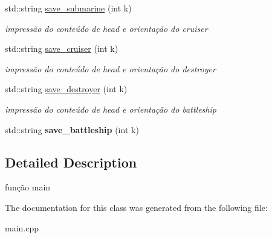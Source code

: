 \begin{DoxyCompactItemize}
\mbox{\label{classpuzzle_a4f95f4e9ad25a48f86b38559a92ad1cc}} 
std\+::string \hyperlink{classpuzzle_a4f95f4e9ad25a48f86b38559a92ad1cc}{save\+\_\+submarine} (int k)
\begin{DoxyCompactList}\small\item\em impressão do conteúdo de head e orientação do cruiser \end{DoxyCompactList}\item 
\mbox{\label{classpuzzle_afe8a003378bb26d97bf3bc872473838e}} 
std\+::string \hyperlink{classpuzzle_afe8a003378bb26d97bf3bc872473838e}{save\+\_\+cruiser} (int k)
\begin{DoxyCompactList}\small\item\em impressão do conteúdo de head e orientação do destroyer \end{DoxyCompactList}\item 
\mbox{\label{classpuzzle_a90b7a1dad1ea5d9ef4a61f0c12846ab7}} 
std\+::string \hyperlink{classpuzzle_a90b7a1dad1ea5d9ef4a61f0c12846ab7}{save\+\_\+destroyer} (int k)
\begin{DoxyCompactList}\small\item\em impressão do conteúdo de head e orientação do battleship \end{DoxyCompactList}\item 
\mbox{\label{classpuzzle_a7e81600f186153f8ab59d43ef30f488f}} 
std\+::string {\bfseries save\+\_\+battleship} (int k)
\end{DoxyCompactItemize}


\subsection{Detailed Description}
função main 

The documentation for this class was generated from the following file\+:\begin{DoxyCompactItemize}
\item 
main.\+cpp\end{DoxyCompactItemize}

